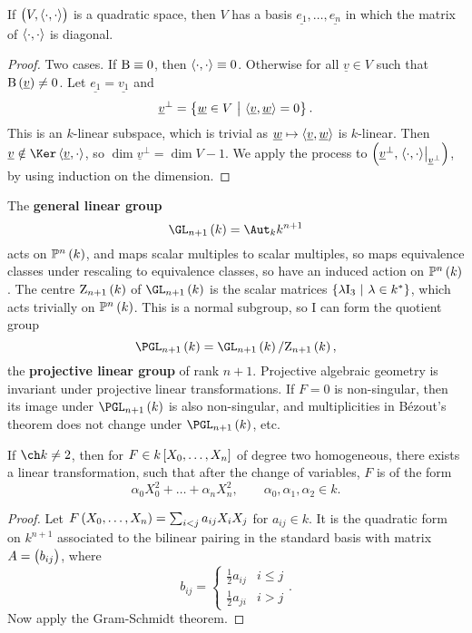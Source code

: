 \begin{theorem}
If $ \br{V, \abr{\cdot, \cdot}} $ is a quadratic space, then $ V $ has a basis $ \underline{e_1}, \dots, \underline{e_n} $ in which the matrix of $ \left\langle \cdot, \cdot \right\rangle $ is diagonal.
\end{theorem}

\begin{proof}
Two cases. If $ \mathrm{B} \equiv 0 $, then $ \left\langle \cdot, \cdot \right\rangle \equiv 0 $. Otherwise for all $ \underline{v} \in V $ such that $ \B\br{\underline{v}} \ne 0 $. Let $ \underline{e_1} = \underline{v_1} $ and
$$ \underline{v}^\perp = \cbr{\underline{w} \in V \st \abr{\underline{v}, \underline{w}} = 0}. $$
This is an $ k $-linear subspace, which is trivial as $ \underline{w} \mapsto \left\langle \underline{v}, \underline{w} \right\rangle $ is $ k $-linear. Then $ \underline{v} \notin \Ker \abr{\underline{v}, \cdot} $, so $ \dim \underline{v}^\perp = \dim V - 1 $. We apply the process to $ \br{\underline{v}^\perp, \eval{\abr{\cdot, \cdot}}_{\underline{v}^\perp}} $, by using induction on the dimension.
\end{proof}

\pagebreak

\begin{remark}
The \textbf{general linear group}
$$ \GL_{n + 1}\br{k} = \Aut_k k^{n + 1} $$
acts on $ \PP^n\br{k} $, and maps scalar multiples to scalar multiples, so maps equivalence classes under rescaling to equivalence classes, so have an induced action on $ \PP^n\br{k} $. The centre $ \Z_{n + 1}\br{k} $ of $ \GL_{n + 1}\br{k} $ is the scalar matrices $ \cbr{\lambda \I_3 \st \lambda \in k^*} $, which acts trivially on $ \PP^n\br{k} $. This is a normal subgroup, so I can form the quotient group
$$ \PGL_{n + 1}\br{k} = \GL_{n + 1}\br{k} / \Z_{n + 1}\br{k}, $$
the \textbf{projective linear group} of rank $ n + 1 $. Projective algebraic geometry is invariant under projective linear transformations. If $ F = 0 $ is non-singular, then its image under $ \PGL_{n + 1}\br{k} $ is also non-singular, and multiplicities in B\'ezout's theorem does not change under $ \PGL_{n + 1}\br{k} $, etc.
\end{remark}

\begin{theorem}
If $ \ch k \ne 2 $, then for $ F \in k\sbr{X_0, \dots, X_n} $ of degree two homogeneous, there exists a linear transformation, such that after the change of variables, $ F $ is of the form
$$ \alpha_0X_0^2 + \dots + \alpha_nX_n^2, \qquad \alpha_0, \alpha_1, \alpha_2 \in k. $$
\end{theorem}

\begin{proof}
Let $ F\br{X_0, \dots, X_n} = \sum_{i < j} a_{ij}X_iX_j $ for $ a_{ij} \in k $. It is the quadratic form on $ k^{n + 1} $ associated to the bilinear pairing in the standard basis with matrix $ A = \br{b_{ij}} $, where
$$ b_{ij} =
\begin{cases}
\tfrac{1}{2}a_{ij} & i \le j \\
\tfrac{1}{2}a_{ji} & i > j
\end{cases}.
$$
Now apply the Gram-Schmidt theorem.
\end{proof}

